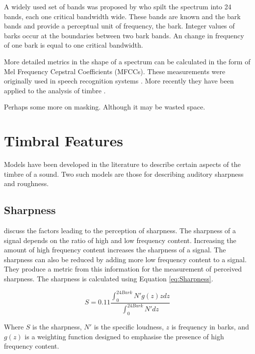 		A widely used set of bands was proposed by \citet{zwicker1961subdivision} who spilt the spectrum into 24
		bands, each one critical bandwidth wide. These bands are known and the bark bands and provide a perceptual
		unit of frequency, the bark. Integer values of barks occur at the boundaries between two bark bands. An
		change in frequency of one bark is equal to one critical bandwidth.

	\note
	{
		More detailed metrics in the shape of a spectrum can be calculated in the form of Mel Frequency
		Cepstral Coefficients (MFCCs). These measurements were originally used in speech recognition
		systems \citep{davis1980comparison}. More recently they have been applied to the analysis of timbre
		\citep{depoli1997sonological}. 
	}

	\note
	{
		Perhaps some more on masking. Although it may be wasted space.
	}

\section{Timbral Features}
\label{sec:Timbre-TimbralFeatures}
	Models have been developed in the literature to describe certain aspects of the timbre of a sound. Two such models
	are those for describing auditory sharpness and roughness.
	
	\subsection{Sharpness}
	\label{sec:Timbre-TimbralFeatures-Sharpness}
		\citet{fastl2007psychoacoustics} discuss the factors leading to the perception of sharpness. The sharpness
		of a signal depends on the ratio of high and low frequency content. Increasing the amount of high frequency
		content increases the sharpness of a signal. The sharpness can also be reduced by adding more low frequency
		content to a signal. They produce a metric from this information for the measurement of perceived
		sharpness.  The sharpness is calculated using Equation \ref{eq:Sharpness}.

		\begin{equation}
			S = 0.11\frac{\int_{0}^{24Bark} N'g(z)zdz}{\int_{0}^{24Bark}N'dz}
			\label{eq:Sharpness}
		\end{equation}

		Where $S$ is the sharpness, $N'$ is the specific loudness, $z$ is frequency in barks, and $g(z)$ is a
		weighting function designed to emphasise the presence of high frequency content.

